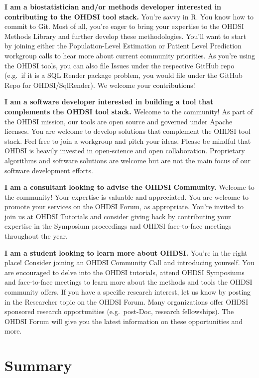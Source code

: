 \documentclass[11pt]{book}
\theoremstyle{definition}
\theoremstyle{definition}
\theoremstyle{definition}
\theoremstyle{remark}
\begin{document}
\textbf{I am a biostatistician and/or methods developer interested in
contributing to the OHDSI tool stack.} You're savvy in R. You know how
to commit to Git. Most of all, you're eager to bring your expertise to
the OHDSI Methods Library and further develop these methodologies.
You'll want to start by joining either the Population-Level Estimation
or Patient Level Prediction workgroup calls to hear more about current
community priorities. As you're using the OHDSI tools, you can also file
Issues under the respective GitHub repo (e.g.~if it is a SQL Render
package problem, you would file under the GitHub Repo for
OHDSI/SqlRender). We welcome your contributions!

\textbf{I am a software developer interested in building a tool that
complements the OHDSI tool stack.} Welcome to the community! As part of
the OHDSI mission, our tools are open source and governed under Apache
licenses. You are welcome to develop solutions that complement the OHDSI
tool stack. Feel free to join a workgroup and pitch your ideas. Please
be mindful that OHDSI is heavily invested in open-science and open
collaboration. Proprietary algorithms and software solutions are welcome
but are not the main focus of our software development efforts.

\textbf{I am a consultant looking to advise the OHDSI Community.}
Welcome to the community! Your expertise is valuable and appreciated.
You are welcome to promote your services on the OHDSI Forum, as
appropriate. You're invited to join us at OHDSI Tutorials and consider
giving back by contributing your expertise in the Symposium proceedings
and OHDSI face-to-face meetings throughout the year.

\textbf{I am a student looking to learn more about OHDSI.} You're in the
right place! Consider joining an OHDSI Community Call and introducing
yourself. You are encouraged to delve into the OHDSI tutorials, attend
OHDSI Symposiums and face-to-face meetings to learn more about the
methods and tools the OHDSI community offers. If you have a specific
research interest, let us know by posting in the Researcher topic on the
OHDSI Forum. Many organizations offer OHDSI sponsored research
opportunities (e.g.~post-Doc, research fellowships). The OHDSI Forum
will give you the latest information on these opportunities and more.

\section{Summary}\label{summary-1}
\end{document}
